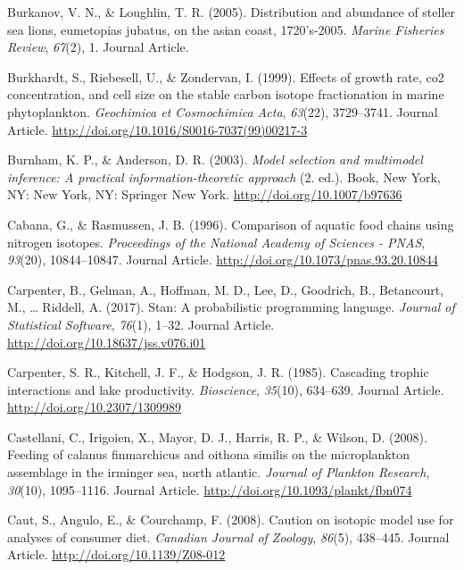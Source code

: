 \documentclass [11pt, proquest] {uwthesis}[2015/03/03]
\begin{document}
\hypertarget{ref-Burkanov2005}{}
Burkanov, V. N., \& Loughlin, T. R. (2005). Distribution and abundance
of steller sea lions, eumetopias jubatus, on the asian coast,
1720's-2005. \emph{Marine Fisheries Review}, \emph{67}(2), 1. Journal
Article.

\hypertarget{ref-Burkhardt1999}{}
Burkhardt, S., Riebesell, U., \& Zondervan, I. (1999). Effects of growth
rate, co2 concentration, and cell size on the stable carbon isotope
fractionation in marine phytoplankton. \emph{Geochimica et Cosmochimica
Acta}, \emph{63}(22), 3729--3741. Journal Article.
\url{http://doi.org/10.1016/S0016-7037(99)00217-3}

\hypertarget{ref-Burnham2003}{}
Burnham, K. P., \& Anderson, D. R. (2003). \emph{Model selection and
multimodel inference: A practical information-theoretic approach} (2.
ed.). Book, New York, NY: New York, NY: Springer New York.
\url{http://doi.org/10.1007/b97636}

\hypertarget{ref-Cabana1996}{}
Cabana, G., \& Rasmussen, J. B. (1996). Comparison of aquatic food
chains using nitrogen isotopes. \emph{Proceedings of the National
Academy of Sciences - PNAS}, \emph{93}(20), 10844--10847. Journal
Article. \url{http://doi.org/10.1073/pnas.93.20.10844}

\hypertarget{ref-Carpenter2017}{}
Carpenter, B., Gelman, A., Hoffman, M. D., Lee, D., Goodrich, B.,
Betancourt, M., \ldots{} Riddell, A. (2017). Stan: A probabilistic
programming language. \emph{Journal of Statistical Software},
\emph{76}(1), 1--32. Journal Article.
\url{http://doi.org/10.18637/jss.v076.i01}

\hypertarget{ref-Carpenter1985}{}
Carpenter, S. R., Kitchell, J. F., \& Hodgson, J. R. (1985). Cascading
trophic interactions and lake productivity. \emph{Bioscience},
\emph{35}(10), 634--639. Journal Article.
\url{http://doi.org/10.2307/1309989}

\hypertarget{ref-Castellani2008}{}
Castellani, C., Irigoien, X., Mayor, D. J., Harris, R. P., \& Wilson, D.
(2008). Feeding of calanus finmarchicus and oithona similis on the
microplankton assemblage in the irminger sea, north atlantic.
\emph{Journal of Plankton Research}, \emph{30}(10), 1095--1116. Journal
Article. \url{http://doi.org/10.1093/plankt/fbn074}

\hypertarget{ref-Caut2008}{}
Caut, S., Angulo, E., \& Courchamp, F. (2008). Caution on isotopic model
use for analyses of consumer diet. \emph{Canadian Journal of Zoology},
\emph{86}(5), 438--445. Journal Article.
\url{http://doi.org/10.1139/Z08-012}
\end{document}
